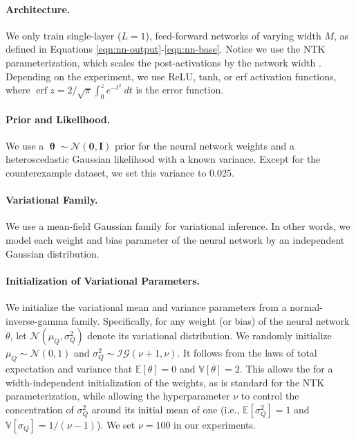 \documentclass[twoside]{article}
\newcommand{\vnull}{\mathbf{0}}
\newcommand{\vtheta}{\bm{\uptheta}}
\newcommand{\mI}{\mathbf{I}}
\newcommand{\opspace}{}
\newcommand{\erf}{\operatorname{erf}\opspace}
\newcommand{\Normal}{\mathcal{N}}
\theoremstyle{theoremstyle}
\begin{document}
\paragraph{Architecture.} We only train single-layer ($L=1$), feed-forward networks of varying width $M$, as defined in Equations \ref{eqn:nn-output}-\ref{eqn:nn-base}. Notice we use the NTK parameterization, which scales the post-activations by the network width \citep{jacot_2020}. Depending on the experiment, we use ReLU, tanh, or erf activation functions, where $\erf{z} = 2/\sqrt{\pi} \int_0^z e^{-t^2}~dt$ is the error function. 

\paragraph{Prior and Likelihood.} We use a $\vtheta \sim \Normal(\vnull, \mI)$ prior for the neural network weights and a heteroscedastic Gaussian likelihood with a known variance. Except for the counterexample dataset, we set this variance to $0.025$.

\paragraph{Variational Family.} We use a mean-field Gaussian family for variational inference. In other words, we model each weight and bias parameter of the neural network by an independent Gaussian distribution. 

\paragraph{Initialization of Variational Parameters.} We initialize the variational mean and variance parameters from a normal-inverse-gamma family. Specifically, for any weight (or bias) of the neural network $\theta$, let $\mathcal{N}(\mu_Q, \sigma_Q^2)$ denote its variational distribution. We randomly initialize $\mu_Q\sim\mathcal{N}(0,1)$ and $\sigma_Q^2 \sim \mathcal{I}\mathcal{G}(\nu+1, \nu)$. It follows from the laws of total expectation and variance that $\mathbb{E}[\theta] = 0$ and $\mathbb{V}[\theta] = 2$. This allows the for a width-independent initialization of the weights, as is standard for the NTK parameterization, while allowing the hyperparameter $\nu$ to control the concentration of $\sigma_Q^2$ around its initial mean of one (i.e., $\mathbb{E}[\sigma_Q^2]=1$ and $\mathbb{V}[\sigma_Q]=1/(\nu-1)$). We set $\nu=100$ in our experiments. 
\end{document}
